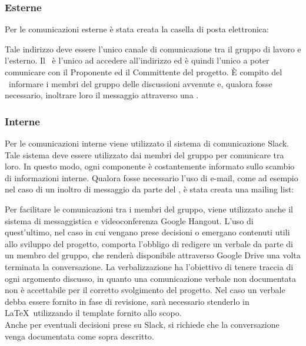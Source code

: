 \documentclass[../NormeDiProgetto.tex]{subfiles}
\begin{document}
			\subsubsection{Esterne}
				Per le comunicazioni esterne è stata creata la casella di posta
				elettronica:
				\begin{center}
					\mailkaleidoscode
				\end{center}
				Tale indirizzo deve essere l'unico canale di comunicazione tra il
				gruppo di lavoro e l'esterno.
				Il \responsabilediprogetto\ è l'unico ad accedere
				all'indirizzo ed è quindi l'unico a poter comunicare con il Proponente ed il
				Committente del progetto. È compito del \responsabilediprogetto\ informare
				i membri del gruppo delle discussioni avvenute e,
				qualora fosse necessario, inoltrare loro il messaggio attraverso
				una .
			\subsubsection{Interne}
				Per le comunicazioni interne viene utilizzato il sistema di
				comunicazione Slack.\\
				Tale sistema deve essere utilizzato dai membri del gruppo
				per comunicare tra loro.
				In questo modo, ogni componente è costantemente informato sullo
				scambio di informazioni interne.
				Qualora fosse necessario l'uso di e-mail, come ad esempio nel caso di
				un inoltro di messaggio da parte del \responsabilediprogetto,
				è stata creata una mailing list:
				\begin{center}
					\mailinglist
				\end{center}
				Per facilitare le comunicazioni tra i membri del gruppo, viene
				utilizzato anche il sistema di messaggistica e videoconferenza
				Google Hangout.
				L'uso di quest'ultimo, nel caso in cui
				vengano prese decisioni	o emergano contenuti utili allo
				sviluppo del progetto, comporta l'obbligo di redigere un verbale
				da parte di un membro del gruppo, che renderà disponibile attraverso
				Google Drive una volta terminata la conversazione.
				La verbalizzazione ha l'obiettivo di tenere
				traccia di ogni argomento discusso, in
				quanto una comunicazione verbale non documentata non è
				accettabile per il corretto svolgimento del progetto. Nel caso un verbale
				debba essere fornito in fase di revisione, sarà necessario stenderlo in \LaTeX\
				utilizzando il template fornito allo scopo.\\
				Anche per eventuali decisioni prese su Slack, si richiede che la conversazione
				venga documentata come sopra descritto.
\end{document}
